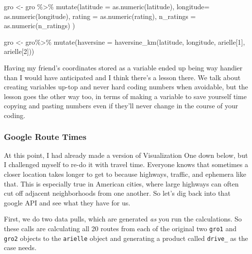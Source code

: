 \documentclass[]{tufte-handout}
\newenvironment{Shaded}{}{}
\newcommand{\AttributeTok}[1]{\textcolor[rgb]{0.49,0.56,0.16}{#1}}
\newcommand{\DecValTok}[1]{\textcolor[rgb]{0.25,0.63,0.44}{#1}}
\newcommand{\FunctionTok}[1]{\textcolor[rgb]{0.02,0.16,0.49}{#1}}
\newcommand{\NormalTok}[1]{#1}
\newcommand{\OtherTok}[1]{\textcolor[rgb]{0.00,0.44,0.13}{#1}}
\newcommand{\SpecialCharTok}[1]{\textcolor[rgb]{0.25,0.44,0.63}{#1}}
\begin{document}
\begin{Shaded}
\begin{Highlighting}[]
\NormalTok{gro }\OtherTok{\textless{}{-}}\NormalTok{ gro }\SpecialCharTok{\%\textgreater{}\%} 
  \FunctionTok{mutate}\NormalTok{(}\AttributeTok{latitude =} \FunctionTok{as.numeric}\NormalTok{(latitude),}
         \AttributeTok{longitude=} \FunctionTok{as.numeric}\NormalTok{(longitude),}
         \AttributeTok{rating =} \FunctionTok{as.numeric}\NormalTok{(rating),}
         \AttributeTok{n\_ratings =} \FunctionTok{as.numeric}\NormalTok{(n\_ratings)}
\NormalTok{         )}

\NormalTok{gro }\OtherTok{\textless{}{-}}\NormalTok{ gro}\SpecialCharTok{\%\textgreater{}\%} 
  \FunctionTok{mutate}\NormalTok{(}\AttributeTok{haversine =} \FunctionTok{haversine\_km}\NormalTok{(latitude, longitude, arielle[}\DecValTok{1}\NormalTok{], arielle[}\DecValTok{2}\NormalTok{]))}
\end{Highlighting}
\end{Shaded}

Having my friend's coordinates stored as a variable ended up being way
handier than I would have anticipated and I think there's a lesson
there. We talk about creating variables up-top and never hard coding
numbers when avoidable, but the lesson goes the other way too, in terms
of making a variable to save yourself time copying and pasting numbers
even if they'll never change in the course of your coding.

\hypertarget{google-route-times}{%
\subsubsection{Google Route Times}\label{google-route-times}}

At this point, I had already made a version of Visualization One down
below, but I challenged myself to re-do it with travel time. Everyone
knows that sometimes a closer location takes longer to get to because
highways, traffic, and ephemera like that. This is especially true in
American cities, where large highways can often cut off adjacent
neighborhoods from one another. So let's dig back into that google API
and see what they have for us.

First, we do two data pulls, which are generated \emph{as} you run the
calculations. So these calls are calculating all 20 routes from each of
the original two \texttt{gro1} and \texttt{gro2} objects to the
\texttt{arielle} object and generating a product called \texttt{drive\_}
as the case needs.
\end{document}
